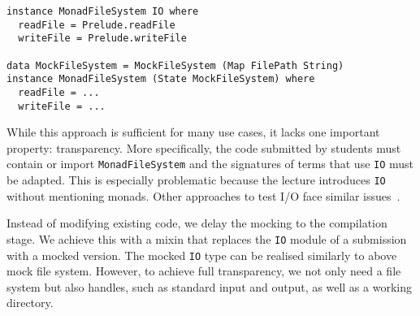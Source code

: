 \begin{verbatim}
instance MonadFileSystem IO where
  readFile = Prelude.readFile
  writeFile = Prelude.writeFile

data MockFileSystem = MockFileSystem (Map FilePath String)
instance MonadFileSystem (State MockFileSystem) where
  readFile = ...
  writeFile = ...
\end{verbatim}
While this approach is sufficient for many use cases,
it lacks one important property: transparency.
More specifically, the code submitted by students must contain or import \texttt{MonadFileSystem} and the signatures of terms that use \texttt{IO} must be adapted.
This is especially problematic because the lecture introduces \texttt{IO} without mentioning monads.
Other approaches to test I/O
face similar issues~\cite{iotest1,iotest2}.

Instead of modifying existing code,
we delay the mocking to the compilation stage.
We achieve this with a mixin that replaces the \texttt{IO} module of a submission with a mocked version.
The mocked \texttt{IO} type can be realised similarly to above mock file system.
However, to achieve full transparency,
we not only need a file system but also handles, such as standard input and output, as well as a working directory.

